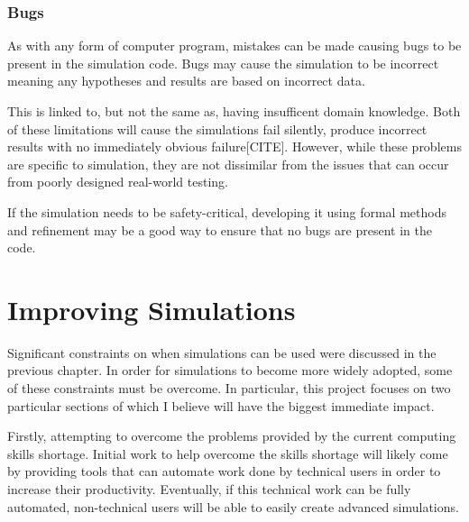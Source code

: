 \documentclass{UoYCSproject}
\begin{document}

\subsubsection{Bugs}
As with any form of computer program, mistakes can be made causing bugs to be present in the simulation code. Bugs may cause the simulation to be incorrect meaning any hypotheses and results are based on incorrect data.

This is linked to, but not the same as, having insufficent domain knowledge. Both of these limitations will cause the simulations fail silently, produce incorrect results with no immediately obvious failure[CITE]. However, while these problems are specific to simulation, they are not dissimilar from the issues that can occur from poorly designed real-world testing. %

If the simulation needs to be safety-critical, developing it using formal methods and refinement may be a good way to ensure that no bugs are present in the code.

\section{Improving Simulations}
\label{improvements}
Significant constraints on when simulations can be used were discussed in the previous chapter. In order for simulations to become more widely adopted, some of these constraints must be overcome. 
In particular, this project focuses on two particular sections of which I believe will have the biggest immediate impact.

Firstly, attempting to overcome the problems provided by the current computing skills shortage. 
Initial work to help overcome the skills shortage will likely come by providing tools that can automate work done by technical users in order to increase their productivity.
Eventually, if this technical work can be fully automated, non-technical users will be able to easily create advanced simulations.
\end{document}
